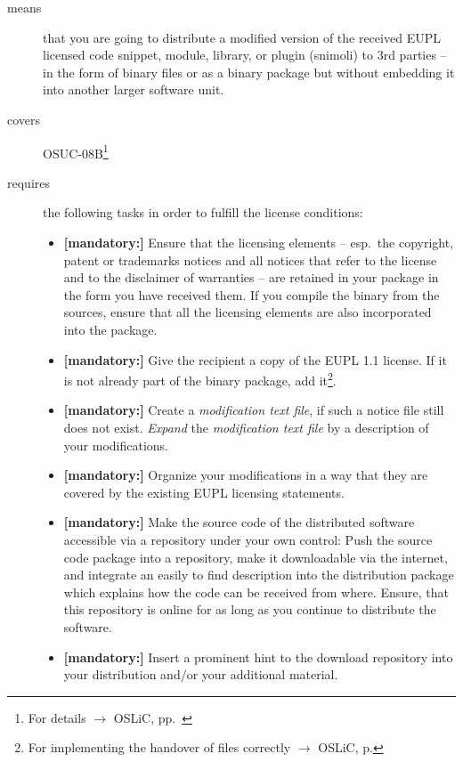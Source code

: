 \begin{description}
\item[means] that you are going to distribute a modified version of the received
EUPL licensed code snippet, module, library, or plugin (snimoli) to 3rd parties
-- in the form of binary files or as a binary package but without embedding it
into another larger software unit.
\item[covers] OSUC-08B\footnote{For details $\rightarrow$ OSLiC, pp.\ \pageref{OSUC-08B-DEF}}
\item[requires] the following tasks in order to fulfill the license conditions:
\begin{itemize}

  \item \textbf{[mandatory:]} Ensure that the licensing elements -- esp.\ the
  copyright, patent or trademarks notices and all notices that refer to the
  license and to the disclaimer of warranties -- are retained in your package in
  the form you have received them. If you compile the binary from the sources,
  ensure that all the licensing elements are also incorporated into the package.
  
 \item \textbf{[mandatory:]} Give the recipient a copy of the EUPL 1.1
  license. If it is not already part of the binary package, add
  it\footnote{For implementing the handover of files correctly $\rightarrow$
  OSLiC, p. \pageref{DistributingFilesHint}}.

  \item \textbf{[mandatory:]} Create a \emph{modification text file}, if such a
  notice file still does not exist. \emph{Expand} the \emph{modification text
  file} by a description of your modifications.

  \item \textbf{[mandatory:]} Organize your modifications in a way that they are
  covered by the existing EUPL licensing statements.
  
  \item \textbf{[mandatory:]} Make the source code of the distributed software
  accessible via a repository under your own control: Push the source code
  package into a repository, make it downloadable via the internet, and
  integrate an easily to find description into the distribution package which
  explains how the code can be received from where. Ensure, that this repository
  is online for as long as you continue to distribute the software.
  
  \item \textbf{[mandatory:]} Insert a prominent hint to the download repository
  into your distribution and/or your additional material.


\end{itemize}
\end{description}
